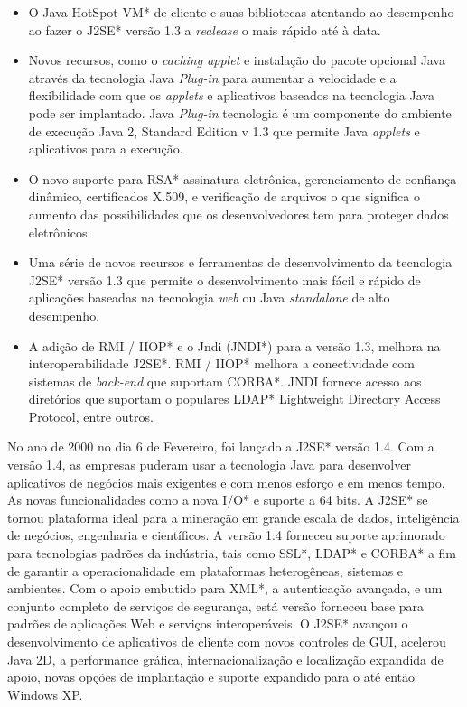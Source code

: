 \begin{itemize}
  \item O Java HotSpot VM* de cliente e suas bibliotecas atentando ao desempenho ao fazer o J2SE* versão 1.3 a {\it realease} o mais rápido até à data.
  \item Novos recursos, como o {\it caching applet} e instalação do pacote opcional Java através da tecnologia Java {\it  Plug-in} para aumentar a velocidade e a flexibilidade com que os {\it applets} e aplicativos baseados na tecnologia Java pode ser implantado. Java {\it  Plug-in} tecnologia é um componente do ambiente de execução Java 2, Standard Edition v 1.3 que permite Java {\it applets} e aplicativos para a execução.
  \item O novo suporte para RSA* assinatura eletrônica, gerenciamento de confiança dinâmico, certificados X.509, e verificação de arquivos o que significa o aumento das possibilidades que os desenvolvedores tem para proteger dados eletrônicos.
  \item Uma série de novos recursos e ferramentas de desenvolvimento da tecnologia J2SE* versão 1.3 que permite o desenvolvimento mais fácil e rápido de aplicações baseadas na tecnologia {\it web} ou Java {\it  standalone} de alto desempenho.
  \item A adição de RMI / IIOP* e o Jndi (JNDI*) para a versão 1.3, melhora na interoperabilidade J2SE*. RMI / IIOP* melhora a conectividade com sistemas de {\it  back-end} que suportam CORBA*. JNDI fornece acesso aos diretórios que suportam o populares LDAP* Lightweight Directory Access Protocol, entre outros.\\
\end{itemize}

No ano de 2000 no dia 6 de Fevereiro, foi lançado a J2SE* versão 1.4. Com a versão 1.4, as empresas puderam usar a tecnologia Java para desenvolver aplicativos de negócios mais exigentes e com menos esforço e em menos tempo. As novas funcionalidades como a nova I/O* e suporte a 64 bits. A J2SE* se tornou plataforma ideal para a mineração em grande escala de dados, inteligência de negócios, engenharia e científicos. A versão 1.4 forneceu suporte aprimorado para tecnologias padrões da indústria, tais como SSL*, LDAP* e CORBA* a fim de garantir a operacionalidade em plataformas heterogêneas, sistemas e ambientes. Com o apoio embutido para XML*, a autenticação avançada, e um conjunto completo de serviços de segurança, está versão forneceu base para padrões de aplicações Web e serviços interoperáveis. O J2SE* avançou o desenvolvimento de aplicativos de cliente com novos controles de GUI, acelerou Java 2D, a performance gráfica, internacionalização e localização expandida de apoio, novas opções de implantação e suporte expandido para o até então Windows XP.\\

